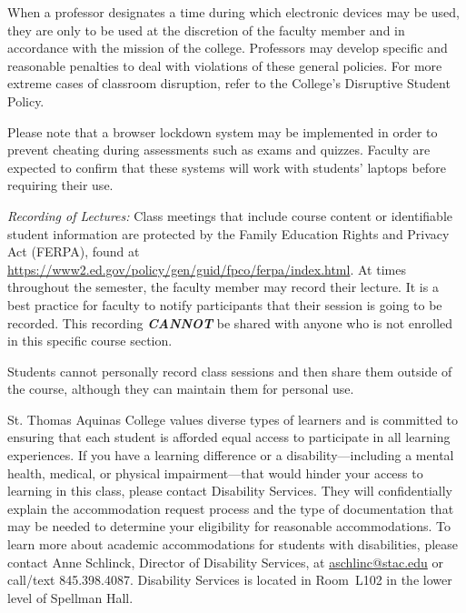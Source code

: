 \documentclass[11pt,letterpaper]{article}
\begin{document}
When a professor designates a time during which electronic devices may be used, they are only to be used at the discretion of the faculty member and in accordance with the mission of the college. Professors may develop specific and reasonable penalties to deal with violations of these general policies. For more extreme cases of classroom disruption, refer to the College's Disruptive Student Policy. \pspace

Please note that a browser lockdown system may be implemented in order to prevent cheating during assessments such as exams and quizzes. Faculty are expected to confirm that these systems will work with students' laptops before requiring their use. \pspace

{\itshape Recording of Lectures:} Class meetings that include course content or identifiable student information are protected by the Family Education Rights and Privacy Act (FERPA), found at \url{https://www2.ed.gov/policy/gen/guid/fpco/ferpa/index.html}. At times throughout the semester, the faculty member may record their lecture. It is a best practice for faculty to notify participants that their session is going to be recorded. This recording \textit{\textbf{CANNOT}} be shared with anyone who is not enrolled in this specific course section. \pspace

Students cannot personally record class sessions and then share them outside of the course, although they can maintain them for personal use. \sectionbreak




St. Thomas Aquinas College values diverse types of learners and is committed to ensuring that each student is afforded equal access to participate in all learning experiences. If you have a learning difference or a disability---including a mental health, medical, or physical impairment---that would hinder your access to learning in this class, please contact Disability Services. They will confidentially explain the accommodation request process and the type of documentation that may be needed to determine your eligibility for reasonable accommodations. To learn more about academic accommodations for students with disabilities, please contact Anne Schlinck, Director of Disability Services, at \href{mailto:aschlinc@stac.edu}{aschlinc@stac.edu} or call/text 845.398.4087. Disability Services is located in Room~L102 in the lower level of Spellman Hall. \pspace
\end{document}
